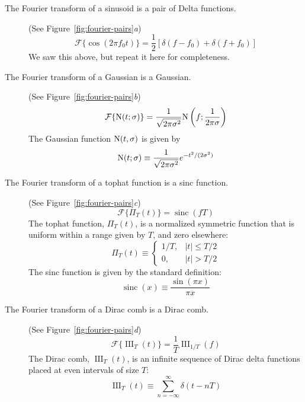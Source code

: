 \documentclass[preprint]{aastex}
\DeclareMathOperator{\sinc}{sinc}
\DeclareMathOperator{\III}{III}
\newcommand{\fig}[1]{Figure~\ref{fig:#1}}
\newcommand{\eqlabel}[1]{\label{eq:#1}}
\begin{document}
\begin{description}
  \item[The Fourier transform of a sinusoid is a pair of Delta functions.]
    (See \fig{fourier-pairs}{\it a})
    \begin{equation}
      \mathcal{F}\{\cos(2\pi f_0 t)\} = \frac{1}{2}\left[\delta(f-f_0) + \delta(f+f_0)\right]
    \end{equation}
    We saw this above, but repeat it here for completeness.

   \item[The Fourier transform of a Gaussian is a Gaussian.]
    (See \fig{fourier-pairs}{\it b})
     \begin{equation}
       \mathcal{F}\{{\rm N}(t; \sigma)\} = \frac{1}{\sqrt{2\pi\sigma^2}}{\rm N}\left(f;\frac{1}{2\pi\sigma}\right)
     \end{equation}
     The Gaussian function ${\rm N}(t, \sigma)$ is given by
     \begin{equation}
       {\rm N}(t; \sigma) \equiv \frac{1}{\sqrt{2\pi\sigma^2}}e^{-t^2/(2\sigma^2)}
     \end{equation}

  \item[The Fourier transform of a tophat function is a sinc function.]
    (See \fig{fourier-pairs}{\it c})
    \begin{equation}
      \mathcal{F}\{\Pi_T(t)\} = \sinc(f T)
    \end{equation}
    The tophat function, $\Pi_T(t)$, is a normalized symmetric function that
    is uniform within a range given by $T$, and zero elsewhere:
    \begin{equation}
      \Pi_T(t)  \equiv \left\{
      \begin{array}{ll}
        1 / T, & |t| \le T / 2 \\
        0,     & |t| > T / 2
      \end{array}
      \right.
    \end{equation}
    The sinc function is given by the standard definition:
    \begin{equation}
      \sinc(x) \equiv \frac{\sin(\pi x)}{\pi x}
    \end{equation}

  \item[The Fourier transform of a Dirac comb is a Dirac comb.]
    (See \fig{fourier-pairs}{\it d})
    \begin{equation}
      \mathcal{F}\{\III_T(t)\} = \frac{1}{T}\III_{1/T}(f)
    \end{equation}
    The Dirac comb, $\III_T(t)$, is an infinite sequence of Dirac delta functions placed at even intervals of size $T$:
    \begin{equation}
      \III_T(t) \equiv \sum_{n=-\infty}^\infty \delta(t - nT)
      \eqlabel{dirac-comb}
    \end{equation}
\end{description}
\end{document}
